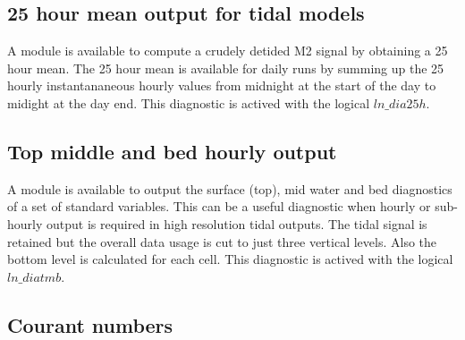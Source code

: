 \documentclass[../tex_main/NEMO_manual]{subfiles}
\begin{document}
\subsection{25 hour mean output for tidal models}



A module is available to compute a crudely detided M2 signal by obtaining a 25 hour mean.
The 25 hour mean is available for daily runs by summing up the 25 hourly instantananeous hourly values from
midnight at the start of the day to midight at the day end.
This diagnostic is actived with the logical $ln\_dia25h$.

\subsection{Top middle and bed hourly output}



A module is available to output the surface (top), mid water and bed diagnostics of a set of standard variables.
This can be a useful diagnostic when hourly or sub-hourly output is required in high resolution tidal outputs.
The tidal signal is retained but the overall data usage is cut to just three vertical levels.
Also the bottom level is calculated for each cell.
This diagnostic is actived with the logical $ln\_diatmb$.

\subsection{Courant numbers}
\end{document}
